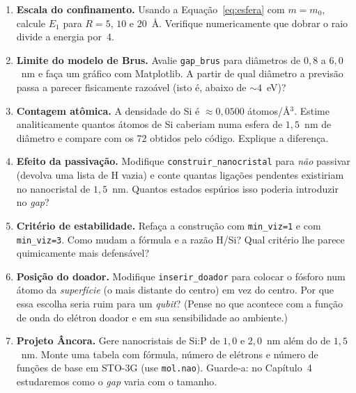 \documentclass[11pt,a4paper,openany]{book}
\newcommand{\code}[1]{\texttt{#1}}
\newcommand{\qubit}{\emph{qubit}}
\begin{document}
\begin{enumerate}[leftmargin=*,label=\textbf{3.\arabic*}]
  \item \textbf{Escala do confinamento.} Usando a Equação~\ref{eq:esfera} com
        $m = m_0$, calcule $E_1$ para $R = 5$, $10$ e $20$~Å. Verifique
        numericamente que dobrar o raio divide a energia por~4.

  \item \textbf{Limite do modelo de Brus.} Avalie \code{gap\_brus} para diâmetros de
        $0{,}8$ a $6{,}0$~nm e faça um gráfico com Matplotlib. A partir de qual
        diâmetro a previsão passa a parecer fisicamente razoável (isto é, abaixo
        de $\sim 4$~eV)?

  \item \textbf{Contagem atômica.} A densidade do Si é $\approx 0{,}0500$
        átomos/Å$^3$. Estime analiticamente quantos átomos de Si caberiam numa
        esfera de $1{,}5$~nm de diâmetro e compare com os 72 obtidos pelo código.
        Explique a diferença.

  \item \textbf{Efeito da passivação.} Modifique \code{construir\_nanocristal} para
        \emph{não} passivar (devolva uma lista de H vazia) e conte quantas ligações
        pendentes existiriam no nanocristal de $1{,}5$~nm. Quantos estados
        espúrios isso poderia introduzir no \emph{gap}?

  \item \textbf{Critério de estabilidade.} Refaça a construção com
        \code{min\_viz=1} e com \code{min\_viz=3}. Como mudam a fórmula e a razão
        H/Si? Qual critério lhe parece quimicamente mais defensável?

  \item \textbf{Posição do doador.} Modifique \code{inserir\_doador} para colocar o
        fósforo num átomo da \emph{superfície} (o mais distante do centro) em vez
        do centro. Por que essa escolha seria ruim para um \qubit{}? (Pense no que
        acontece com a função de onda do elétron doador e em sua sensibilidade ao
        ambiente.)

  \item \textbf{Projeto Âncora.} Gere nanocristais de Si:P de $1{,}0$ e
        $2{,}0$~nm além do de $1{,}5$~nm. Monte uma tabela com fórmula, número de
        elétrons e número de funções de base em STO-3G (use \code{mol.nao}).
        Guarde-a: no Capítulo~4 estudaremos como o \emph{gap} varia com o tamanho.
\end{enumerate}
\end{document}
